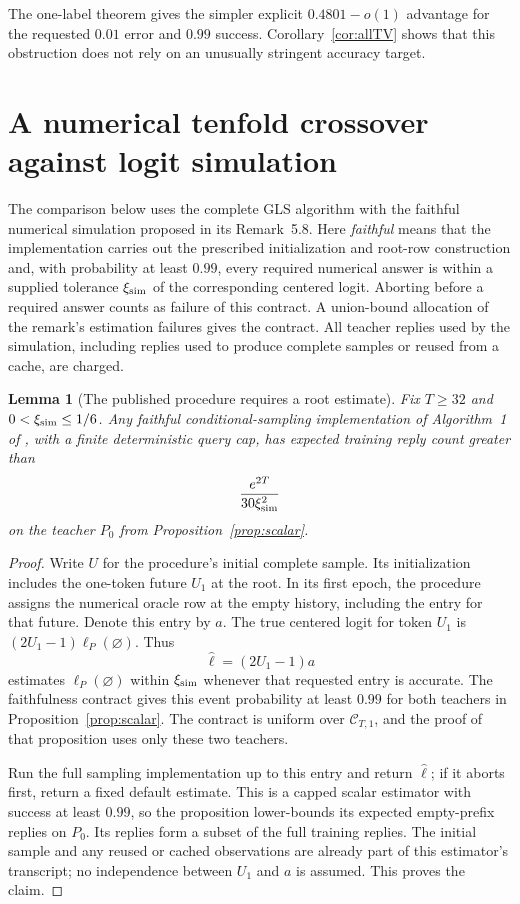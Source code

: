 \documentclass[11pt]{article}
\newtheorem{lemma}[theorem]{Lemma}
\theoremstyle{definition}
\theoremstyle{remark}
\begin{document}
The one-label theorem gives the simpler explicit $0.4801-o(1)$ advantage for the requested $0.01$ error and $0.99$ success. Corollary~\ref{cor:allTV} shows that this obstruction does not rely on an unusually stringent accuracy target.



\section{A numerical tenfold crossover against logit simulation}\label{sec:crossover}

The comparison below uses the complete GLS algorithm with the faithful numerical simulation proposed in its Remark~5.8. Here \emph{faithful} means that the implementation carries out the prescribed initialization and root-row construction and, with probability at least $0.99$, every required numerical answer is within a supplied tolerance $\xi_{\rm sim}$ of the corresponding centered logit. Aborting before a required answer counts as failure of this contract. A union-bound allocation of the remark's estimation failures gives the contract. All teacher replies used by the simulation, including replies used to produce complete samples or reused from a cache, are charged.

\begin{lemma}[The published procedure requires a root estimate]\label{lem:gls-root-simulation}
Fix $T\ge32$ and $0<\xi_{\rm sim}\le1/6$. Any faithful conditional-sampling implementation of Algorithm~1 of \citet{gls2}, with a finite deterministic query cap, has expected training reply count greater than
\[
\frac{e^{2T}}{30\xi_{\rm sim}^2}
\]
on the teacher $P_0$ from Proposition~\ref{prop:scalar}.
\end{lemma}
\begin{proof}
Write $U$ for the procedure's initial complete sample. Its initialization includes the one-token future $U_1$ at the root. In its first epoch, the procedure assigns the numerical oracle row at the empty history, including the entry for that future. Denote this entry by $a$. The true centered logit for token $U_1$ is $(2U_1-1)\ell_P(\varnothing)$. Thus
\[
\widehat\ell=(2U_1-1)a
\]
estimates $\ell_P(\varnothing)$ within $\xi_{\rm sim}$ whenever that requested entry is accurate. The faithfulness contract gives this event probability at least $0.99$ for both teachers in Proposition~\ref{prop:scalar}. The contract is uniform over $\mathcal C_{T,1}$, and the proof of that proposition uses only these two teachers.

Run the full sampling implementation up to this entry and return $\widehat\ell$; if it aborts first, return a fixed default estimate. This is a capped scalar estimator with success at least $0.99$, so the proposition lower-bounds its expected empty-prefix replies on $P_0$. Its replies form a subset of the full training replies. The initial sample and any reused or cached observations are already part of this estimator's transcript; no independence between $U_1$ and $a$ is assumed. This proves the claim.
\end{proof}
\end{document}
